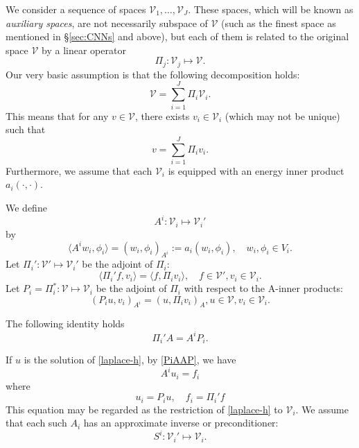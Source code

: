 We consider a sequence of spaces $\mathcal V_{1},\ldots,\mathcal V_{J}$.  
These spaces, which will be known as {\it auxiliary spaces}, are not
necessarily subspace of $\mathcal  V$ 
(such as the finest space as mentioned in \S \ref{sec:CNNs} and above), 
but each of them is related to the
original space $\mathcal  V$ by a linear operator
$$
\Pi_{j}: \mathcal V_{j} \mapsto \mathcal V. 
$$ 
Our very basic assumption is that the following decomposition holds:
\begin{equation}
\label{aux-decomp}
\mathcal V=\sum_{i=1}^J\Pi_i \mathcal V_i. 
\end{equation}
This means that for any $v\in \mathcal  V$, there exists $v_i\in \mathcal  V_i$ (which may
not be unique) such that 
\begin{equation}
\label{aux-decomp0}
v=\sum_{i=1}^J \Pi_i v_i.   
\end{equation}
Furthermore, we assume that each $\mathcal  V_i$ is equipped with an energy inner product
$a_i(\cdot,\cdot)$. 

We define
$$
 A^i:  \mathcal  V_i\mapsto \mathcal V_i'
$$ 
by
$$
\langle A^i w_i,\phi_i \rangle= (w_i,\phi_i)_{A^i}:=a_i(w_i,\phi_i), \quad w_i,\phi_i\in V_i. 
$$
Let $\Pi_i':  \mathcal  V' \mapsto \mathcal V_i'$ be the adjoint of $\Pi_i$:
$$
\langle \Pi_i'f, v_i\rangle=\langle f,\Pi_i v_i\rangle, \quad f\in \mathcal  V',  v_i\in \mathcal V_i.
$$
Let $P_i=\Pi_i^*: \mathcal V\mapsto \mathcal V_i$ be the adjoint of $\Pi_i$ with respect
to the A-inner products:
$$
(P_iu,v_i)_{A^i}=(u,\Pi_iv_i)_{A}, u\in \mathcal V, v_i\in \mathcal V_i.
$$

\begin{lemma}
	The following identity holds
	\begin{equation}
	\label{PiAAP}
	\Pi_i'A=A^iP_i.
	\end{equation}
\end{lemma}

If $u$ is the solution of \eqref{laplace-h}, by \eqref{PiAAP}, we have
\begin{equation}
\label{3.3a}A^iu_i=f_i
\end{equation}
where 
$$
u_i=P_iu, \quad f_i=\Pi_i'f
$$
This equation may be regarded as the restriction of  \eqref{laplace-h} to
$\mathcal V_i$. 
We assume that each such $A_i$ has an approximate inverse or preconditioner:
\begin{equation}
\label{Ri}
S^i: \mathcal V_i'\mapsto \mathcal V_i.   
\end{equation}

